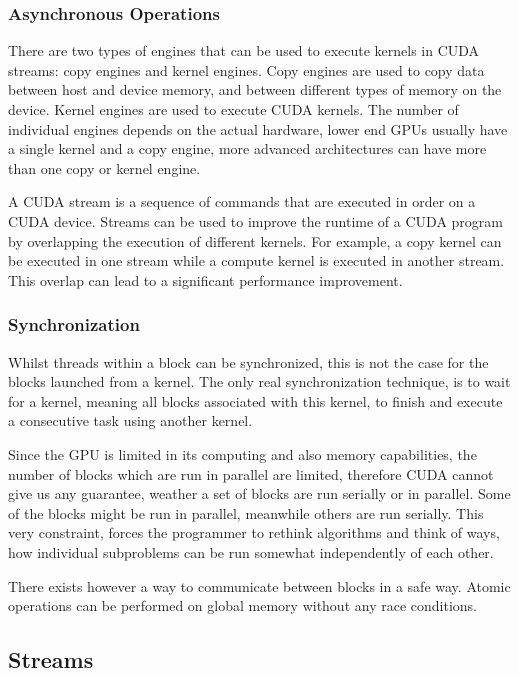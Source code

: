 \documentclass[]{article}
\begin{document}
\subsubsection{Asynchronous Operations} \label{sec:async}

There are two types of engines that can be used to execute kernels in CUDA streams: copy engines and kernel engines. Copy engines are used to copy data between host and device memory, and between different types of memory on the device. Kernel engines are used to execute CUDA kernels. The number of individual engines depends on the actual hardware, lower end GPUs usually have a single kernel and a copy engine, more advanced architectures can have more than one copy or kernel engine.

A CUDA stream is a sequence of commands that are executed in order on a CUDA device. Streams can be used to improve the runtime of a CUDA program by overlapping the execution of different kernels. For example, a copy kernel can be executed in one stream while a compute kernel is executed in another stream. This overlap can lead to a significant performance improvement.


\subsubsection{Synchronization}

Whilst threads within a block can be synchronized, this is not the case for the blocks launched from a kernel. The only real synchronization technique, is to wait for a kernel, meaning all blocks associated with this kernel, to finish and execute a consecutive task using another kernel. 

Since the GPU is limited in its computing and also memory capabilities, the number of blocks which are run in parallel are limited, therefore CUDA cannot give us any guarantee, weather a set of blocks are run serially or in parallel. Some of the blocks might be run in parallel, meanwhile others are run serially. This very constraint, forces the programmer to rethink algorithms and think of ways, how individual subproblems can be run somewhat independently of each other. 

There exists however a way to communicate between blocks in a safe way. Atomic operations can be performed on global memory without any race conditions.

\subsection{Streams}
\end{document}
